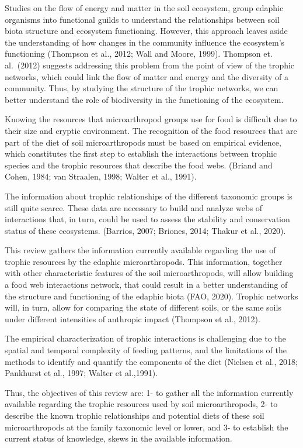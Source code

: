 \documentclass[10pt,oneside]{article}
\begin{document}
Studies on the flow of energy and matter in the soil ecosystem, group
edaphic organisms into functional guilds to understand the relationships
between soil biota structure and ecosystem functioning. However, this
approach leaves aside the understanding of how changes in the community
influence the ecosystem's functioning (Thompson et al., 2012; Wall and
Moore, 1999). Thompson et. al.~(2012) suggests addressing this problem
from the point of view of the trophic networks, which could link the
flow of matter and energy and the diversity of a community. Thus, by
studying the structure of the trophic networks, we can better understand
the role of biodiversity in the functioning of the ecosystem.

Knowing the resources that microarthropod groups use for food is
difficult due to their size and cryptic environment. The recognition of
the food resources that are part of the diet of soil microarthropods
must be based on empirical evidence, which constitutes the first step to
establish the interactions between trophic species and the trophic
resources that describe the food webs. (Briand and Cohen, 1984; van
Straalen, 1998; Walter et al., 1991).

The information about trophic relationships of the different taxonomic
groups is still quite scarce. These data are necessary to build and
analyze webs of interactions that, in turn, could be used to assess the
stability and conservation status of these ecosystems. (Barrios, 2007;
Briones, 2014; Thakur et al., 2020).

This review gathers the information currently available regarding the
use of trophic resources by the edaphic microarthropods. This
information, together with other characteristic features of the soil
microarthropods, will allow building a food web interactions network,
that could result in a better understanding of the structure and
functioning of the edaphic biota (FAO, 2020). Trophic networks will, in
turn, allow for comparing the state of different soils, or the same
soils under different intensities of anthropic impact (Thompson et al.,
2012).

The empirical characterization of trophic interactions is challenging
due to the spatial and temporal complexity of feeding patterns, and the
limitations of the methods to identify and quantify the components of
the diet (Nielsen et al., 2018; Pankhurst et al., 1997; Walter et
al.,1991).

Thus, the objectives of this review are: 1- to gather all the
information currently available regarding the trophic resources used by
soil microarthropods, 2- to describe the known trophic relationships and
potential diets of these soil microarthropods at the family taxonomic
level or lower, and 3- to establish the current status of knowledge,
skews in the available information.
\end{document}
